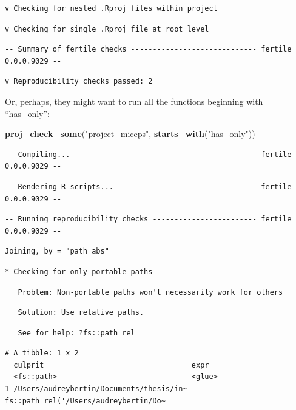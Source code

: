 \documentclass[12pt,twoside]{reedthesis}
\newenvironment{Shaded}{\begin{snugshade}}{\end{snugshade}}
\newcommand{\KeywordTok}[1]{\textcolor[rgb]{0.13,0.29,0.53}{\textbf{#1}}}
\newcommand{\StringTok}[1]{\textcolor[rgb]{0.31,0.60,0.02}{#1}}
\newcommand{\NormalTok}[1]{#1}
\begin{document}
\begin{verbatim}
v Checking for nested .Rproj files within project
\end{verbatim}
\begin{verbatim}
v Checking for single .Rproj file at root level
\end{verbatim}
\begin{verbatim}
-- Summary of fertile checks ----------------------------- fertile 0.0.0.9029 --
\end{verbatim}
\begin{verbatim}
v Reproducibility checks passed: 2
\end{verbatim}
Or, perhaps, they might want to run all the functions beginning with
``has\_only'':
\begin{Shaded}
\begin{Highlighting}[]
\KeywordTok{proj_check_some}\NormalTok{(}\StringTok{"project_miceps"}\NormalTok{, }\KeywordTok{starts_with}\NormalTok{(}\StringTok{"has_only"}\NormalTok{))}
\end{Highlighting}
\end{Shaded}
\begin{verbatim}
-- Compiling... ------------------------------------------ fertile 0.0.0.9029 --
\end{verbatim}
\begin{verbatim}
-- Rendering R scripts... -------------------------------- fertile 0.0.0.9029 --
\end{verbatim}
\begin{verbatim}
-- Running reproducibility checks ------------------------ fertile 0.0.0.9029 --
\end{verbatim}
\begin{verbatim}
Joining, by = "path_abs"
\end{verbatim}
\begin{verbatim}
* Checking for only portable paths
\end{verbatim}
\begin{verbatim}
   Problem: Non-portable paths won't necessarily work for others
\end{verbatim}
\begin{verbatim}
   Solution: Use relative paths.
\end{verbatim}
\begin{verbatim}
   See for help: ?fs::path_rel
\end{verbatim}
\begin{verbatim}
# A tibble: 1 x 2
  culprit                                  expr                                 
  <fs::path>                               <glue>                               
1 /Users/audreybertin/Documents/thesis/in~ fs::path_rel('/Users/audreybertin/Do~
\end{verbatim}
\end{document}
